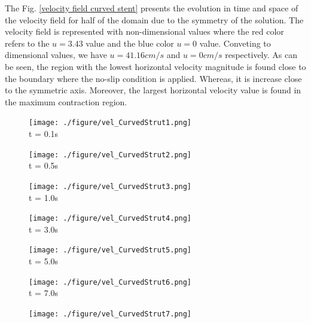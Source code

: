 \documentclass[10pt,fleqn,a4paper,twoside]{article}
\begin{document}
\newpage
The Fig. \ref{velocity field curved stent}  presents the evolution in 
time and space of the velocity field for half of the domain
due to the symmetry of the solution. 
The velocity field is represented with non-dimensional values 
where the red color refers to the $u=3.43$ value and the blue color 
$u=0$ value. Conveting to dimensional values, 
we have $u=41.16cm/s$ and $u=0cm/s$ respectively.
As can be seen, the region with the lowest horizontal velocity 
magnitude is found close to the boundary where the no-slip
condition is applied. Whereas, it is increase close to 
the symmetric axis. Moreover, the largest horizontal velocity value
is found in the maximum contraction region.


\vspace{1cm} 
\begin{figure}[H]
     \begin{minipage}{.50\linewidth}
      \centering
      \texttt{[image: ./figure/vel\_CurvedStrut1.png]}\\
      t = 0.1s
     \end{minipage}%
     \begin{minipage}{.50\linewidth}
      \centering
      \texttt{[image: ./figure/vel\_CurvedStrut2.png]}\\
      t = 0.5s
     \end{minipage}
     \begin{minipage}{.50\linewidth}
     \medskip
      \centering
      \texttt{[image: ./figure/vel\_CurvedStrut3.png]}\\
      t = 1.0s
     \end{minipage}%
     \begin{minipage}{.50\linewidth}
     \medskip
      \centering
      \texttt{[image: ./figure/vel\_CurvedStrut4.png]}\\
      t = 3.0s
     \end{minipage}
     \begin{minipage}{.50\linewidth}
      \centering
      \texttt{[image: ./figure/vel\_CurvedStrut5.png]}\\
      t = 5.0s
     \end{minipage}%
     \begin{minipage}{.50\linewidth}
      \centering
      \texttt{[image: ./figure/vel\_CurvedStrut6.png]}\\
      t = 7.0s
     \end{minipage}
     \begin{minipage}{.50\linewidth}
     \medskip
      \centering
      \texttt{[image: ./figure/vel\_CurvedStrut7.png]}\\

\end{minipage}
\end{figure}
\end{document}
